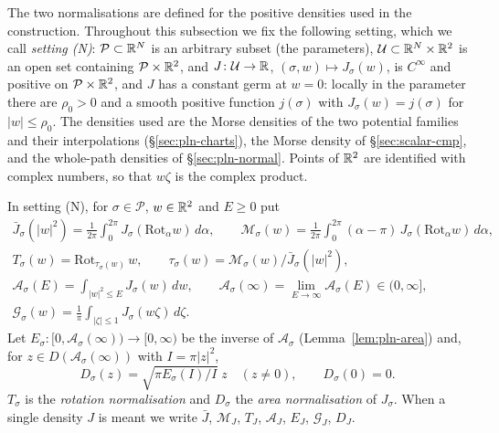 The two normalisations are defined for the positive densities used in the construction. Throughout this
subsection we fix the following setting, which we call \emph{setting (N)}: $\mathcal P\subset\mathbb{R}^N$ is
an arbitrary subset (the parameters), $\mathcal U\subset\mathbb{R}^N\times\mathbb{R}^2$ is an open set containing
$\mathcal P\times\mathbb{R}^2$, and $J\colon\mathcal U\to\mathbb{R}$, $(\sigma,w)\mapsto J_\sigma(w)$, is $C^\infty$ and
positive on $\mathcal P\times\mathbb{R}^2$, and $J$ has a constant germ at $w=0$: locally in the parameter there are
$\rho_0>0$ and a smooth positive function $j(\sigma)$ with $J_\sigma(w)=j(\sigma)$ for $|w|\le\rho_0$. The densities
used are the Morse densities of the two potential families and their interpolations (\S\ref{sec:pln-charts}), the
Morse density of \S\ref{sec:scalar-cmp}, and the whole-path densities of \S\ref{sec:pln-normal}. Points of $\mathbb{R}^2$ are
identified with complex numbers, so that $w\zeta$ is the complex product.

\begin{definition}\label{def:pln-normalisations}
In setting (N), for $\sigma\in\mathcal P$, $w\in\mathbb{R}^2$ and $E\ge0$ put
\begin{gather*}
 \bar J_\sigma(|w|^2)=\frac1{2\pi}\int_0^{2\pi}J_\sigma(\mathrm{Rot}_\alpha w)\,d\alpha,\qquad
 \mathcal M_\sigma(w)=\frac1{2\pi}\int_0^{2\pi}(\alpha-\pi)\,J_\sigma(\mathrm{Rot}_\alpha w)\,d\alpha,\\
 T_\sigma(w)=\mathrm{Rot}_{\tau_\sigma(w)}\,w,\qquad \tau_\sigma(w)=\mathcal M_\sigma(w)/\bar J_\sigma(|w|^2),\\
 \mathcal A_\sigma(E)=\int_{|w|^2\le E}J_\sigma(w)\,dw,\qquad
 \mathcal A_\sigma(\infty)=\lim_{E\to\infty}\mathcal A_\sigma(E)\in(0,\infty],\\
 \mathcal G_\sigma(w)=\frac1\pi\int_{|\zeta|\le1}J_\sigma(w\zeta)\,d\zeta .
\end{gather*}
Let $E_\sigma\colon[0,\mathcal A_\sigma(\infty))\to[0,\infty)$ be the inverse of $\mathcal A_\sigma$
(Lemma~\ref{lem:pln-area}) and, for $z\in D(\mathcal A_\sigma(\infty))$ with $I=\pi|z|^2$,
\[
 D_\sigma(z)=\sqrt{\pi E_\sigma(I)/I}\;z\quad(z\ne0),\qquad D_\sigma(0)=0 .
\]
$T_\sigma$ is the \emph{rotation normalisation} and $D_\sigma$ the \emph{area normalisation} of $J_\sigma$.
When a single density $J$ is meant we write $\bar J$, $\mathcal M_J$, $T_J$, $\mathcal A_J$, $E_J$, $\mathcal G_J$, $D_J$.
\end{definition}

